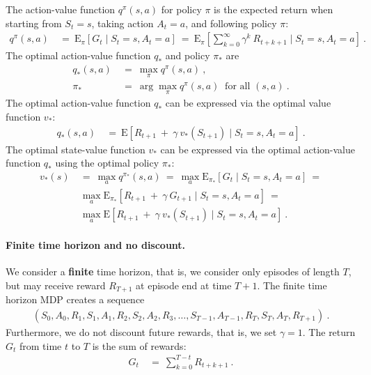 \documentclass{article}
\newcommand\EXP{\mathbf{\mathrm{E}}}
\begin{document}
\begin{appendices}
The action-value function $q^{\pi}(s,a)$ for policy $\pi$ is the
expected return when starting from $S_t=s$, taking action $A_t=a$,
and following policy $\pi$:
\begin{align}
  q^{\pi}(s,a) \ &= \ \EXP_{\pi} \left[ G_t \mid S_t=s, A_t=a \right]
   \ = \ \EXP_{\pi} \left[\sum_{k=0}^{\infty}  \gamma^k
   \ R_{t+k+1}  \mid S_t=s, A_t=a \right] \ .  
\end{align}
The optimal action-value function $q_{*}$ and policy $\pi_{*}$ are
\begin{align}
  q_{*}(s,a) \ &= \ \max_{\pi} q^{\pi}(s,a) \ , \\
  \pi_{*} \ &= \ \arg\max_{\pi} q^{\pi}(s,a) \ \text{ for all } (s,a) \ .
\end{align}
The optimal action-value function $q_{*}$ can be expressed via the optimal value
function  $v_{*}$:
\begin{align}
  q_{*}(s,a) \ &= \ \EXP \left[ R_{t+1} \ + \ \gamma \ v_{*}(S_{t+1})
   \mid S_t=s,A_t=a\right] \ .  
\end{align}
The optimal state-value function $v_{*}$
can be expressed via the optimal action-value
function  $q_{*}$ using the optimal policy $\pi_{*}$: 
\begin{align}
  v_{*}(s) \ &= \ \max_{a} q^{\pi_{*}}(s,a) \ = \ 
   \max_{a} \EXP_{\pi_{*}} \left[ G_t \mid S_t=s,A_t=a\right] \ = \\ \nonumber
   &\max_{a} \EXP_{\pi_{*}} \left[ R_{t+1} \ + \
       \gamma \ G_{t+1}\mid S_t=s,A_t=a\right]  \ = \\ \nonumber
   &\max_{a} \EXP \left[ R_{t+1} \ + \ \gamma \ v_{*}(S_{t+1}) \mid S_t=s,A_t=a\right] \ .  
\end{align}

\paragraph{Finite time horizon and no discount.}
We consider a {\bf finite} time horizon, that is, we consider only
episodes of length $T$, but may receive reward $R_{T+1}$ at episode end at time $T+1$.
The finite time horizon MDP creates a sequence
\begin{align}
\left(S_0,A_0,R_1,S_1,A_1,R_2,S_2,A_2,R_3,\ldots,S_{T-1},A_{T-1},R_T,S_T,A_T,R_{T+1}\right) \ .
\end{align}
Furthermore, we do not discount future rewards, that is, we set $\gamma=1$.
The return $G_t$ from time $t$ to $T$ is the sum of rewards:
\begin{align}
    G_t \ &= \   \sum_{k=0}^{T-t}  R_{t+k+1} \ .
\end{align}


\end{appendices}
\end{document}

